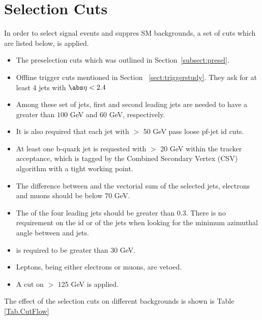 \section{Selection Cuts}
\label{sect:cuts}


In order to select signal events and suppres SM backgrounds, a set of cuts which are listed below, is applied.
\begin{itemize}
\item The preselection cuts which was outlined in Section~\ref{subsect:presel}.
\item Offline trigger cuts mentioned in Section ~\ref{sect:triggerstudy}. They ask for at least 4 jets with $\abs\eta<2.4$
\item Among these set of jets, first and second leading jets are needed to have a \pT greater than $100$ GeV and $60$ GeV, respectively.
\item It is also required that each jet with \pT $>$ 50 GeV pass loose pf-jet id cuts.
\item At least one b-quark jet is requested with \pT $>$ 20 GeV within the tracker acceptance, which is tagged by the Combined Secondary Vertex (CSV) algorithm with a tight working point.
\item The difference between \met and the vectorial \pT sum of the selected jets, electrons and muons should be below $70$ GeV.
\item The \mindphifour of the four leading jets should be greater than 0.3. There is no requirement on the id or \pT of the jets when looking for the minimum azimuthal angle between \met and jets. 
\item \met is required to be greater than $30$ GeV. 
\item Leptons, being either electrons or muons, are vetoed.
\item A cut on \mttwo $>$ 125 GeV is applied.
\end{itemize}

The effect of the selection cuts on different backgrounds is shown is Table \ref{Tab.CutFlow}

